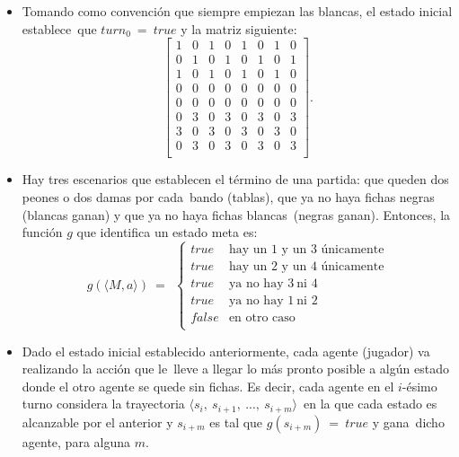 \documentclass[paper=letter, fontsize=12pt]{scrartcl} %
\numberwithin{equation}{section} %
\numberwithin{figure}{section} %
\numberwithin{table}{section} %
\begin{document}
\begin{itemize}
\item Tomando como convención que siempre empiezan las blancas, el estado inicial establece\
  que $turn_0\ =\ true$ y la matriz siguiente:
  \[
  \begin{bmatrix}
    1&0&1&0&1&0&1&0 \\
    0&1&0&1&0&1&0&1 \\
    1&0&1&0&1&0&1&0 \\
    0&0&0&0&0&0&0&0 \\
    0&0&0&0&0&0&0&0 \\
    0&3&0&3&0&3&0&3 \\
    3&0&3&0&3&0&3&0 \\
    0&3&0&3&0&3&0&3 \\
  \end{bmatrix}.
  \]

\item Hay tres escenarios que establecen el término de una partida: que queden dos peones o dos damas por cada\
  bando (tablas), que ya no haya fichas negras (blancas ganan) y que ya no haya fichas blancas\
  (negras ganan). Entonces, la función $g$ que identifica un estado meta es:
  \[
  g(\langle M,a \rangle)\ =\ \
  \begin{cases}
    true & \text{hay\ un\ } 1 \text{\ y\ un\ } 3 \text{\ únicamente}\\
    true & \text{hay\ un\ } 2 \text{\ y\ un\ } 4 \text{\ únicamente}\\
    true & \text{ya\ no\ hay\ } 3\ \text{ni\ } 4\\
    true & \text{ya\ no\ hay\ } 1\ \text{ni\ } 2\\
    false & \text{en\ otro\ caso}\\
  \end{cases}
  \]

\item Dado el estado inicial establecido anteriormente, cada agente (jugador) va realizando la acción que le\
  lleve a llegar lo más pronto posible a algún estado donde el otro agente se quede sin fichas. Es decir,
  cada agente en el $i$-ésimo turno considera la trayectoria $\langle s_i,\ s_{i+1},\ ... ,\ s_{i+m} \rangle$\
  en la que cada estado es alcanzable por el anterior y $s_{i+m}$ es tal que $g(s_{i+m})\ =\ true$ y gana\
  dicho agente, para alguna $m$.
\end{itemize}
 
\end{document}
